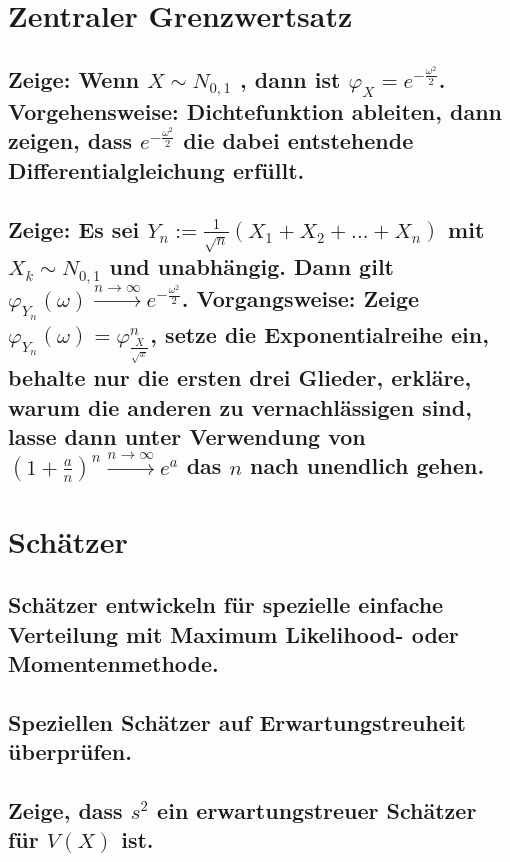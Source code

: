 \documentclass[a4paper,10pt]{article}
\begin{document}
\section{Zentraler Grenzwertsatz}

\subsection{Zeige: Wenn $X \sim N_{0,1}$ , dann ist $\varphi_X = e^{- \frac{\omega^2}{2}}$. Vorgehensweise: Dichtefunktion ableiten, dann zeigen, dass $e^{- \frac{\omega^2}{2}}$ die dabei entstehende Differentialgleichung erfüllt.}

\subsection{Zeige: Es sei $Y_n:= \frac{1}{\sqrt{n}} (X_1 + X_2 + . . . + X_n)$ mit $X_k \sim N_{0,1}$ und unabhängig. Dann gilt $\varphi_{Y_{n}}(\omega)\xrightarrow{n\rightarrow \infty} e^{- \frac{\omega^2}{2}}$. Vorgangsweise: Zeige $\varphi_{Y_{n}}(\omega) = \varphi^{n}_{\frac{X}{\sqrt{x}}}$, setze die Exponentialreihe ein, behalte nur die ersten drei Glieder, erkläre, warum die anderen zu vernachlässigen sind, lasse dann unter Verwendung von $(1 + \frac{a}{n})^n \xrightarrow{n\rightarrow \infty} e^a$ das $n$ nach unendlich gehen.}

\newpage
\section{Schätzer}
\subsection{Schätz\-er ent\-wick\-eln für spe\-ziel\-le ein\-fache \\ Ver\-teil\-ung mit Maximum Likeli\-hood- oder Momenten\-methode.}

\subsection{Speziellen Schätzer auf Erwartungs\-treuheit \\ überprüfen.}

\subsection{Zeige, dass $s^2$ ein erwartungstreuer Schätzer für $V(X)$ ist.}
\end{document}
